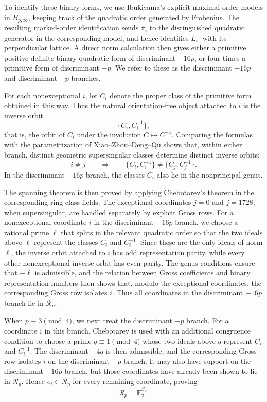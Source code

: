 \documentclass[10pt,a4paper]{amsart}
\newcommand{\F}{\mathbb{F}}
\begin{document}
To identify these binary forms, we use Ibukiyama's explicit maximal-order
models in $B_{p,\infty}$, keeping track of the quadratic order generated by
Frobenius. The resulting marked-order identification sends $\pi_i$ to the
distinguished quadratic generator in the corresponding model, and hence
identifies $L_i^\perp$ with its perpendicular lattice. A direct norm
calculation then gives either a primitive positive-definite binary quadratic
form of discriminant $-16p$, or four times a primitive form of discriminant
$-p$. We refer to these as the discriminant $-16p$ and discriminant $-p$
branches.

For each nonexceptional $i$, let $C_i$ denote the proper class of the
primitive form obtained in this way. Thus the natural orientation-free
object attached to $i$ is the inverse orbit
\[
  \{C_i,C_i^{-1}\},
\]
that is, the orbit of $C_i$ under the involution $C\mapsto C^{-1}$.
Comparing the formulas with the parametrization of Xiao--Zhou--Deng--Qu
\cite[Theorems~3.3, 3.5 and~3.7]{XZDQ2025} shows that, within either
branch, distinct geometric supersingular classes determine distinct
inverse orbits:
\[
  i\ne j
  \qquad\Longrightarrow\qquad
  \{C_i,C_i^{-1}\}\ne\{C_j,C_j^{-1}\}.
\]
In the discriminant $-16p$ branch, the classes $C_i$ also
lie in the nonprincipal genus.

The spanning theorem is then proved by applying Chebotarev's theorem in
the corresponding ring class fields. The exceptional coordinates $j=0$
and $j=1728$, when supersingular, are handled separately by explicit Gross
rows. For a nonexceptional coordinate $i$ in the discriminant $-16p$
branch, we choose a rational prime $\ell$ that splits in the relevant
quadratic order so that the two ideals above $\ell$ represent the classes
$C_i$ and $C_i^{-1}$. Since these are the only ideals of norm $\ell$, the
inverse orbit attached to $i$ has odd representation parity, while every
other nonexceptional inverse orbit has even parity. The genus conditions
ensure that $-\ell$ is admissible, and the relation between Gross
coefficients and binary representation numbers then shows that, modulo the
exceptional coordinates, the corresponding Gross row isolates $i$. Thus
all coordinates in the discriminant $-16p$ branch lie in $\mathcal R_p$.

When $p\equiv3\pmod4$, we next treat the discriminant $-p$ branch. For a
coordinate $i$ in this branch, Chebotarev is used with an additional
congruence condition to choose a prime $q\equiv1\pmod4$ whose two ideals
above $q$ represent $C_i$ and $C_i^{-1}$. The discriminant $-4q$ is then
admissible, and the corresponding Gross row isolates $i$ on the
discriminant $-p$ branch. It may also have support on the
discriminant $-16p$ branch, but those coordinates have already been shown
to lie in $\mathcal R_p$. Hence $e_i\in\mathcal R_p$ for every remaining
coordinate, proving
\[
  \mathcal R_p=\F_2^{S_p}.
\]
\end{document}

